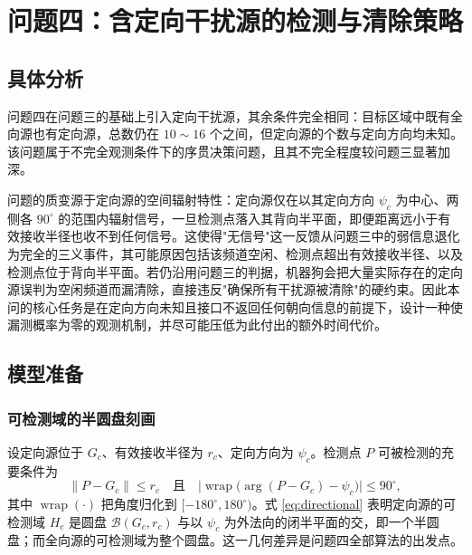 \documentclass[12pt,a4paper]{ctexart}
\begin{document}
\section{问题四：含定向干扰源的检测与清除策略}

\subsection{具体分析}

问题四在问题三的基础上引入定向干扰源，其余条件完全相同：目标区域中既有全向源也有定向源，总数仍在 $10\sim16$ 个之间，但定向源的个数与定向方向均未知。该问题属于不完全观测条件下的序贯决策问题，且其不完全程度较问题三显著加深。

问题的质变源于定向源的空间辐射特性：定向源仅在以其定向方向 $\psi_c$ 为中心、两侧各 $90^\circ$ 的范围内辐射信号，一旦检测点落入其背向半平面，即便距离远小于有效接收半径也收不到任何信号。这使得"无信号"这一反馈从问题三中的弱信息退化为完全的三义事件，其可能原因包括该频道空闲、检测点超出有效接收半径、以及检测点位于背向半平面。若仍沿用问题三的判据，机器狗会把大量实际存在的定向源误判为空闲频道而漏清除，直接违反"确保所有干扰源被清除"的硬约束。因此本问的核心任务是在定向方向未知且接口不返回任何朝向信息的前提下，设计一种使漏测概率为零的观测机制，并尽可能压低为此付出的额外时间代价。

\subsection{模型准备}

\subsubsection{可检测域的半圆盘刻画}

设定向源位于 $G_c$、有效接收半径为 $r_c$、定向方向为 $\psi_c$。检测点 $P$ 可被检测的充要条件为
\begin{equation}
\lVert P-G_c\rVert\le r_c
\quad\text{且}\quad
\bigl\lvert\operatorname{wrap}\bigl(\arg(P-G_c)-\psi_c\bigr)\bigr\rvert\le90^\circ ,
\label{eq:directional}
\end{equation}
其中 $\operatorname{wrap}(\cdot)$ 把角度归化到 $[-180^\circ,180^\circ)$。式 \eqref{eq:directional} 表明定向源的可检测域 $H_c$ 是圆盘 $\mathcal B(G_c,r_c)$ 与以 $\psi_c$ 为外法向的闭半平面的交，即一个半圆盘；而全向源的可检测域为整个圆盘。这一几何差异是问题四全部算法的出发点。
\end{document}
